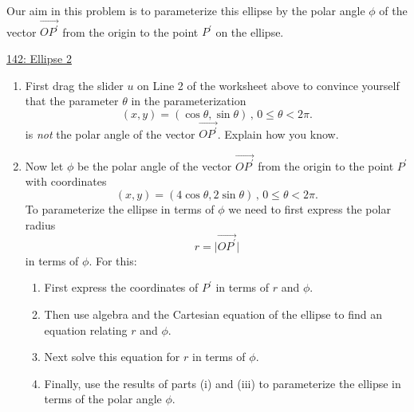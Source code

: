 \documentclass{ximera}
\begin{document}
Our aim in this problem is to parameterize this ellipse by the polar angle $\phi$ of the vector $\overrightarrow{OP^\prime}$ from the origin to the point $P^\prime$ on the ellipse.

\begin{onlineOnly}
    \begin{center}
\end{center}
\end{onlineOnly}

\href{https://www.desmos.com/calculator/nbdmgb1nbv}{142: Ellipse 2}


\begin{enumerate}
\item First drag the slider $u$ on Line 2 of the worksheet above to convince yourself that the parameter $\theta$ in the parameterization 
\[
    (x,y) = (\cos \theta , \sin\theta ) \, , \, 0 \leq \theta <2\pi .
\]
is \emph{not} the polar angle of the vector $\overrightarrow{OP^\prime}$. Explain how you know.

\begin{freeResponse}
\end{freeResponse}

\item Now let $\phi$ be the polar angle of the vector $\overrightarrow{OP^\prime}$ from the origin to the point $P^\prime$ with coordinates
\[
        (x,y) = (4\cos \theta , 2\sin\theta) \, , \, 0\leq \theta <2\pi .
\]
To parameterize the ellipse in terms of $\phi$ we need to first express the polar radius  
\[
   r = \Big| \overrightarrow{OP^\prime}  \Big|
\]
in terms of $\phi$. For this:

\begin{enumerate}
\item First express the coordinates of $P^\prime$ in terms of $r$ and $\phi$.

\item Then use algebra and the Cartesian equation of the ellipse to find an equation relating $r$ and $\phi$.

\item Next solve this equation for $r$ in terms of $\phi$. 

\item Finally, use the results of parts (i) and (iii) to parameterize the ellipse in terms of the polar angle $\phi$.
\end{enumerate}


\end{enumerate}
\end{document}

